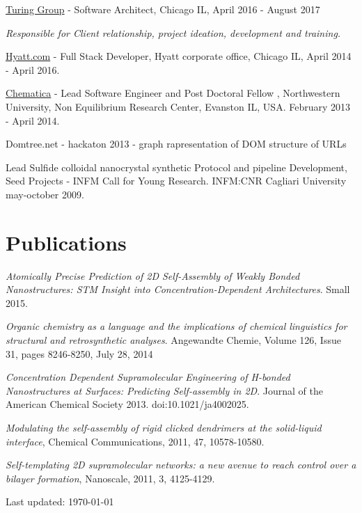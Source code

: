 \documentclass[11pt,letterpaper]{article}
\def\footerlink{}
\renewenvironment{itemize}{
  \begin{list}{}{
    \setlength{\leftmargin}{1.5em}
  }
}{
  \end{list}
}
\begin{document}
\begin{itemize}
% 

\item \href{http://www.turinggroup.com}{Turing Group} - Software Architect,  Chicago  IL, April 2016 - August 2017 

\textit{Responsible for Client relationship, project ideation, development and training. }
\item \href{http://www.hyatt.com}{Hyatt.com} -  Full Stack Developer, Hyatt corporate office,  Chicago  IL, April 2014 - April 2016. 
\item \href{http://www.chematica.net}{Chematica} - Lead Software Engineer and Post Doctoral Fellow , Northwestern University, Non Equilibrium Research Center, Evanston IL, USA. February 2013 - April 2014.
\item Domtree.net - hackaton 2013 -  graph rapresentation of DOM structure of URLs
 \item  Lead Sulfide colloidal nanocrystal synthetic Protocol and pipeline Development, Seed Projects -  INFM Call for Young Research. INFM:CNR
   Cagliari University may-october 2009.
% 
\end{itemize}
\section*{Publications}
\begin {itemize}
\item       \textit{Atomically Precise Prediction of 2D Self-Assembly of Weakly Bonded Nanostructures: STM Insight into Concentration-Dependent Architectures}. Small 2015.
\item       \textit{Organic chemistry as a language and the implications of chemical linguistics for structural and retrosynthetic analyses}. Angewandte Chemie, Volume 126, Issue 31, pages 8246-8250, July 28, 2014
\item 	    \textit{Concentration Dependent Supramolecular Engineering of H-bonded Nanostructures at Surfaces: Predicting Self-assembly in 2D}. Journal of the American Chemical Society 2013. doi:10.1021/ja4002025.
\item  \textit{Modulating the self-assembly of rigid clicked dendrimers at the solid-liquid interface}, Chemical Communications, 2011, 47, 10578-10580.
\item  \textit{
Self-templating 2D supramolecular networks: a new avenue to reach control over a bilayer formation}, Nanoscale, 2011, 3, 4125-4129.
\end{itemize}




\begin{center}
  \begin{footnotesize}
    Last updated: \today \\
    \href{\footerlink}{\texttt{\footerlink}}
  \end{footnotesize}
\end{center}
\end{document}
